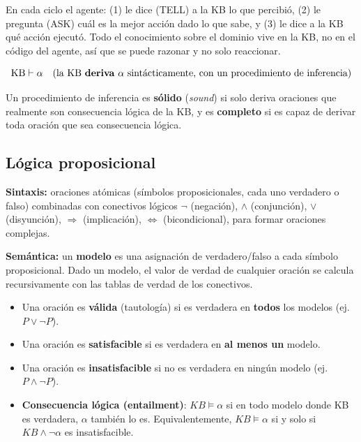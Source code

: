 \begin{definition}
    En cada ciclo el agente: (1) le dice (TELL) a la KB lo que percibió, (2) le pregunta (ASK) cuál es la mejor acción
    dado lo que sabe, y (3) le dice a la KB qué acción ejecutó. Todo el conocimiento sobre el dominio vive en la KB,
    no en el código del agente, así que se puede razonar y no solo reaccionar.
\end{definition}

$$\text{KB} \vdash \alpha \quad \text{(la KB \textbf{deriva} } \alpha \text{ sintácticamente, con un procedimiento de inferencia)}$$

Un procedimiento de inferencia es \textbf{sólido} (\emph{sound}) si solo deriva oraciones que realmente son
consecuencia lógica de la KB, y es \textbf{completo} si es capaz de derivar toda oración que sea consecuencia lógica.

\subsection{Lógica proposicional}

\textbf{Sintaxis:} oraciones atómicas (símbolos proposicionales, cada uno verdadero o falso) combinadas con conectivos
lógicos $\neg$ (negación), $\land$ (conjunción), $\lor$ (disyunción), $\Rightarrow$ (implicación), $\Leftrightarrow$
(bicondicional), para formar oraciones complejas.

\textbf{Semántica:} un \textbf{modelo} es una asignación de verdadero/falso a cada símbolo proposicional. Dado un
modelo, el valor de verdad de cualquier oración se calcula recursivamente con las tablas de verdad de los conectivos.

\begin{itemize}
    \item Una oración es \textbf{válida} (tautología) si es verdadera en \textbf{todos} los modelos (ej. $P \lor \neg P$).
    \item Una oración es \textbf{satisfacible} si es verdadera en \textbf{al menos un} modelo.
    \item Una oración es \textbf{insatisfacible} si no es verdadera en ningún modelo (ej. $P \land \neg P$).
    \item \textbf{Consecuencia lógica (entailment)}: $KB \models \alpha$ si en todo modelo donde KB es verdadera,
    $\alpha$ también lo es. Equivalentemente, $KB \models \alpha$ si y solo si $KB \land \neg\alpha$ es insatisfacible.
\end{itemize}

